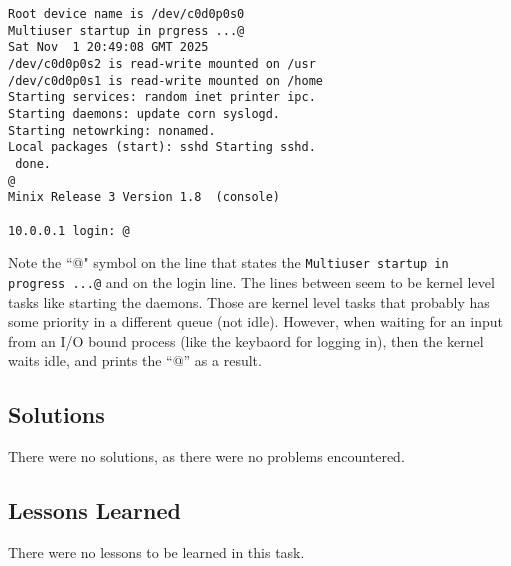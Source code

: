\documentclass[11pt]{article}
\begin{document}
\begin{verbatim}
Root device name is /dev/c0d0p0s0
Multiuser startup in prgress ...@
Sat Nov  1 20:49:08 GMT 2025
/dev/c0d0p0s2 is read-write mounted on /usr
/dev/c0d0p0s1 is read-write mounted on /home
Starting services: random inet printer ipc.
Starting daemons: update corn syslogd.
Starting netowrking: nonamed.
Local packages (start): sshd Starting sshd.
 done.
@
Minix Release 3 Version 1.8  (console)

10.0.0.1 login: @
\end{verbatim}

Note the ``@" symbol on the line that states the {\tt Multiuser startup in progress ...@} and on the login line. The lines between seem to be kernel level tasks like starting the daemons. Those are kernel level tasks that probably has some priority in a different queue (not idle). However, when waiting for an input from an I/O bound process (like the keybaord for logging in), then the kernel waits idle, and prints the ``@'' as a result. 

\subsection{Solutions}
There were no solutions, as there were no problems encountered.

\subsection{Lessons Learned}
There were no lessons to be learned in this task.
\end{document}
